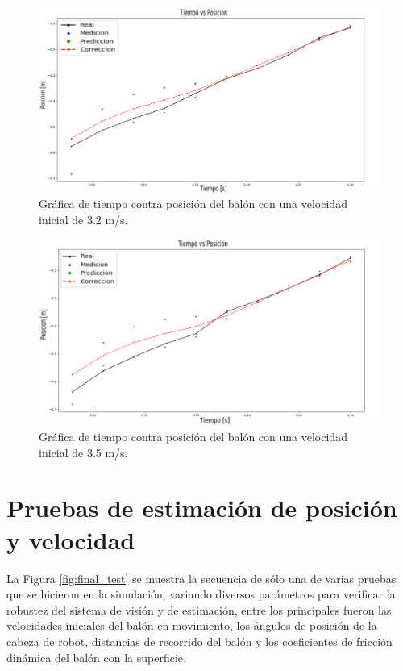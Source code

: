 \begin{figure}
\centering
	\includegraphics[scale=0.3]{images/test_vel_3dot2.png}
	\caption{Gráfica de tiempo contra posición del balón con una velocidad inicial de 3.2 m/s.}
	\label{fig:estimator_graphic_2}
\end{figure}

\begin{figure}
\centering
	\includegraphics[scale=0.3]{images/test_vel_3dot5.png}
	\caption{Gráfica de tiempo contra posición del balón con una velocidad inicial de 3.5 m/s.}	
	\label{fig:estimator_graphic_3}
\end{figure}
	
	\section{Pruebas de estimación de posición y velocidad}
	La Figura \ref{fig:final_test} se muestra la secuencia de sólo una de varias pruebas que se hicieron en la simulación, variando diversos parámetros para verificar la robustez del sistema de visión y de estimación, entre los principales fueron las velocidades iniciales del balón en movimiento, los ángulos de posición de la cabeza de robot, distancias de recorrido del balón y los coeficientes de fricción dinámica del balón con la superficie.
	
